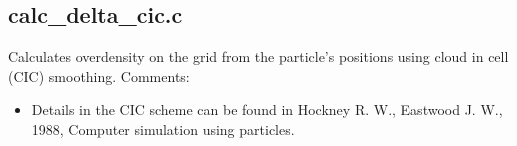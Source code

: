 \documentclass[letterpaper,10pt,english]{sphinxmanual}
\begin{document}
\subsection{calc\_delta\_cic.c}
\label{\detokenize{sphinx-c-apidoc/output/pm/calc_delta_cic_c:calc-delta-cic-c}}\label{\detokenize{sphinx-c-apidoc/output/pm/calc_delta_cic_c::doc}}
Calculates overdensity on the grid from the particle’s positions using cloud
in cell (CIC) smoothing.
Comments:
\begin{itemize}
\item {} 
Details in the CIC scheme can be found in
Hockney R. W., Eastwood J. W., 1988, Computer simulation using particles.

\end{itemize}
\end{document}
